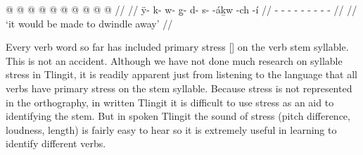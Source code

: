 \ex\label{ex:root+stem-ha-suffix+suffix}%
%
\begingl
	\gla	{} @ {} @ {} @ {} @ {} @ {} @ {} @ {} @ {} @ {} @ {} //
	\glp	\llap{[}\rlap{\ipa{jà.kʷʰùː.qàs.ˈ\gm{héː}.jáqʷ.tʃì}]} {} {} {} {} {} {} {} {} {} {} //
	\glb	ÿ- k- w- g̱- d- s-   -áḵw -ch -í //
	\glc	\xx{qual}- - - - - - 
			 - - - //
	\gld	{} {} {} {} {} {} {} {} {} {} {} //
	\glft	‘it would be made to dwindle away’
		//
\endgl
\xe

Every verb word so far has included primary stress [] on the verb stem syllable.
This is not an accident.
Although we have not done much research on syllable stress in Tlingit, it is readily apparent just from listening to the language that all verbs have primary stress on the stem syllable.
Because stress is not represented in the orthography, in written Tlingit it is difficult to use stress as an aid to identifying the stem.
But in spoken Tlingit the sound of stress (pitch difference, loudness, length) is fairly easy to hear so it is extremely useful in learning to identify different verbs.

\stopcontents[chapters]